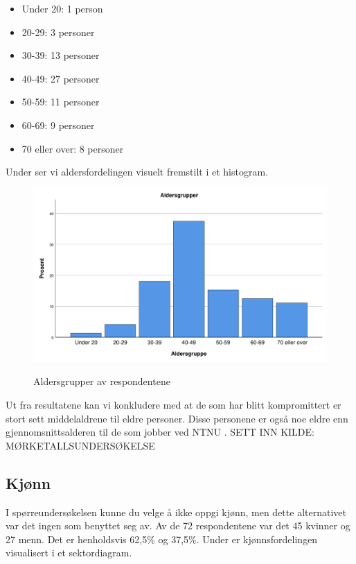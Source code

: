 \begin{itemize}
    \item Under 20: 1 person
    \item 20-29: 3 personer
    \item 30-39: 13 personer
    \item 40-49: 27 personer
    \item 50-59: 11 personer
    \item 60-69: 9 personer
    \item 70 eller over: 8 personer
\end{itemize}

Under ser vi aldersfordelingen visuelt fremstilt i et histogram.

\begin{figure}[H]
    \centering
    \includegraphics[scale=0.5]{case_2/bilder/spss/aldersgrupper.pdf}
    \label{fig:aldersgruppe}
    \caption[aldersgruppe]{Aldersgrupper av respondentene}
\end{figure}

Ut fra resultatene kan vi konkludere med at de som har blitt kompromittert er stort sett middelaldrene til eldre personer. Disse personene er også noe eldre enn gjennomsnittsalderen til de som jobber ved NTNU \cite{}. SETT INN KILDE: MØRKETALLSUNDERSØKELSE

\subsection{Kjønn}
I spørreundersøkelsen kunne du velge å ikke oppgi kjønn, men dette alternativet var det ingen som benyttet seg av. Av de 72 respondentene var det 45 kvinner og 27 menn. Det er henholdsvis 62,5\% og 37,5\%. Under er kjønnsfordelingen visualisert i et sektordiagram.

